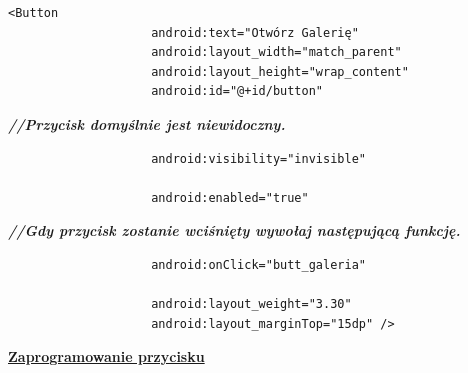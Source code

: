 \begin{verbatim}
<Button
                    android:text="Otwórz Galerię"
                    android:layout_width="match_parent"
                    android:layout_height="wrap_content"
                    android:id="@+id/button"\end{verbatim}
                                                                                               \textit{\textbf{//Przycisk domyślnie jest niewidoczny.}}\begin{verbatim}
                    android:visibility="invisible"
                    
                    android:enabled="true"\end{verbatim}
                                                                                                                   \textit{\textbf{//Gdy przycisk zostanie wciśnięty wywołaj następującą funkcję.}}
                                                                                                                     \begin{verbatim}
                    android:onClick="butt_galeria"
                    
                    android:layout_weight="3.30"
                    android:layout_marginTop="15dp" />
\end{verbatim}

\begin{center}
\underline{\textbf{Zaprogramowanie przycisku}}
\end{center}

